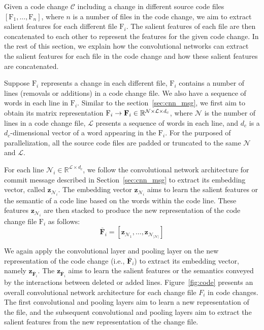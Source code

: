 Given a code change $\mathcal{C}$ including a change in different source code files $[\text{F}_1, \dots, \text{F}_n]$, where $n$ is a number of files in the code change, we aim to extract salient features for each different file $\text{F}_i$. The salient features of each file are then concatenated to each other to represent the features for the given code change. In the rest of this section, we explain how the convolutional networks can extract the salient features for each file in the code change and how these salient features are concatenated. 

Suppose $\text{F}_i$ represents a change in each different file, $\text{F}_i$ contains a number of lines (removals or additions) in a code change file. We also have a sequence of words in each line in $\text{F}_i$. Similar to the section~\ref{sec:cnn_msg}, we first aim to obtain its matrix representation $\text{F}_i \rightarrow \textbf{\text{F}}_i \in \mathbb{R}^{\mathcal{N} \times \mathcal{L} \times{d_c}}$, where $\mathcal{N}$ is the number of lines in a code change file, $\mathcal{L}$ presents a sequence of words in each line, and $d_c$ is a $d_c$-dimensional vector of a word appearing in the $\text{F}_i$. For the purposed of parallelization, all the source code files are padded or truncated to the same $\mathcal{N}$ and $\mathcal{L}$. 

For each line $\mathcal{N}_i \in \mathbb{R}^{\mathcal{L} \times d_c}$, we follow the convolutional network architecture for commit message described in Section~\ref{sec:cnn_msg} to extract its embedding vector, called $\textbf{z}_{\mathcal{N}_i}$. The embedding vector $\textbf{z}_{\mathcal{N}_i}$ aims to learn the salient features or the semantic of a code line based on the words within the code line. These features $\textbf{z}_{\mathcal{N}_i}$ are then stacked to produce the new representation of the code change file $\text{F}_i$ as follows: 
\begin{equation}
\label{eq:concatenate}
\overline{\textbf{F}}_{i} = [\textbf{z}_{\mathcal{N}_1}, \dots, \textbf{z}_{\mathcal{N}_{|\mathcal{N}|}}]
\end{equation}

We again apply the convolutional layer and pooling layer on the new representation of the code change (i.e., $\overline{\textbf{F}}_{i}$) to extract its embedding vector, namely $\textbf{z}_{\overline{\textbf{F}}_{i}}$. The $\textbf{z}_{\overline{\textbf{F}}_{i}}$ aims to learn the salient features or the semantics conveyed by the interactions between deleted or added lines. Figure~\ref{fig:code} presents an overall convolutional network architecture for each change file $F_i$ in code changes. The first convolutional and pooling layers aim to learn a new representation of the file, and the subsequent convolutional and pooling layers aim to extract the salient features from the new representation of the change file. 

